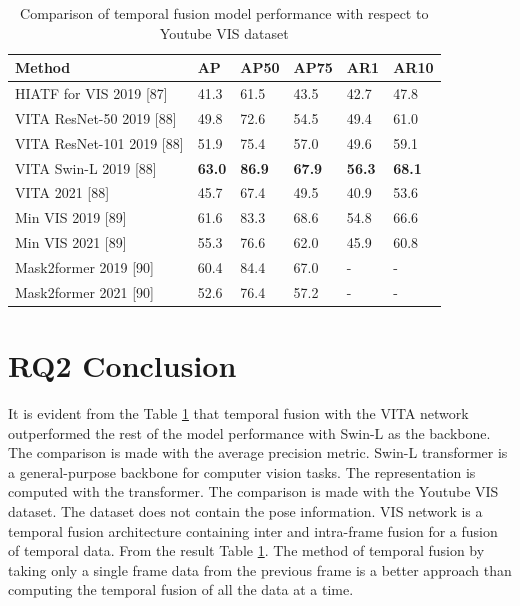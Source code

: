     \begin{table}[h]
    	\begin{center}
    		\begin{tabular}{ | l | l| l| l| l| p{2cm} |}
    			\hline
    			
    			\cellcolor{purple!30}Method & \cellcolor{purple!30}AP & \cellcolor{purple!30}AP50 & \cellcolor{purple!30}AP75 & \cellcolor{purple!30}AR1 & \cellcolor{purple!30}AR10 \\ \hline
    			HIATF for VIS 2019 [87] & 41.3 & 61.5 & 43.5 & 42.7 & 47.8 \\ \hline
    			VITA ResNet-50 2019 [88]  & 49.8 & 72.6 & 54.5 & 49.4 & 61.0  \\ \hline
    			VITA ResNet-101 2019 [88]  & 51.9 & 75.4 & 57.0 & 49.6 & 59.1 \\ \hline
    			VITA Swin-L 2019 [88]  & { \bf 63.0}  & { \bf 86.9} & { \bf 67.9} & { \bf 56.3} & { \bf 68.1} \\ \hline
    			VITA 2021 [88]  & 45.7 & 67.4 & 49.5 & 40.9 & 53.6 \\ \hline
    			Min VIS 2019 [89] & 61.6 & 83.3 & 68.6 & 54.8 & 66.6 \\ \hline
    			Min VIS 2021 [89] & 55.3 & 76.6 & 62.0 & 45.9 & 60.8 \\ \hline
    			Mask2former 2019 [90]  & 60.4 & 84.4 & 67.0 & - & - \\ \hline
    			Mask2former 2021 [90]  & 52.6 & 76.4 & 57.2 & - & - \\ \hline
    			\hline
    		\end{tabular}
    		\caption{Comparison of temporal fusion model performance with respect to Youtube VIS dataset}
    		\label{tab:sota_ytube_vis}
    	\end{center}
    \end{table}
    
    \section{RQ2 Conclusion}
    
    It is evident from the Table \ref{tab:sota_ytube_vis} that temporal fusion with the VITA network outperformed the rest of the model performance with Swin-L as the backbone. The comparison is made with the average precision metric. Swin-L transformer is a general-purpose backbone for computer vision tasks. The representation is computed with the transformer. The comparison is made with the Youtube VIS dataset. The dataset does not contain the pose information. VIS network is a temporal fusion architecture containing inter and intra-frame fusion for a fusion of temporal data. From the result Table \ref{tab:sota_ytube_vis}. The method of temporal fusion by taking only a single frame data from the previous frame is a better approach than computing the temporal fusion of all the data at a time.
    
